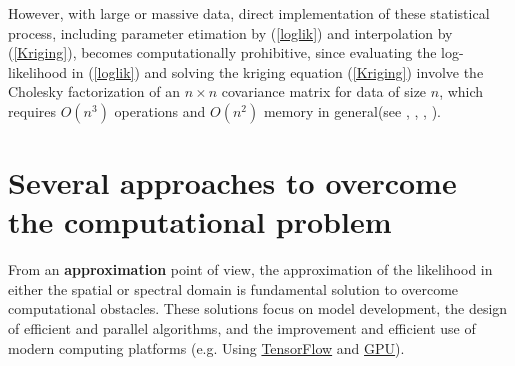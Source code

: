 \documentclass[
12pt, %
a4paper, %
oneside, %
headinclude,footinclude, %
BCOR5mm, %
]{scrartcl}
\begin{document}
However, with large or massive data, direct implementation of these statistical process, including parameter etimation by (\ref{loglik}) and interpolation by (\ref{Kriging}), becomes computationally prohibitive, since evaluating the log-likelihood in (\ref{loglik}) and solving the kriging equation (\ref{Kriging}) involve the Cholesky factorization of an $n \times n$ covariance matrix for data of size $n$, which requires $O(n^3)$ operations and $O(n^2)$ memory in general(see \href{https://chenyw68.github.io/Literature/[2012]Advances and Challenges in Space-time Modelling of Natural Events.pdf}{\cite{porcu2012advances}}, \href{https://chenyw68.github.io/Literature/[2012]A full scale approximation of covariance functions for large spatial data sets.pdf}{\cite{sang2012full}}, \href{https://chenyw68.github.io/Literature/[2018]A case study competition among methods for analyzing large spatial data.pdf}{\cite{heaton2019case}}, \href{https://chenyw68.github.io/Literature/[2020]A Fused Gaussian Process Model for Very Large Spatial Data.pdf}{\cite{ma2020fused}}).

\section{Several approaches to overcome the computational problem}
From an \textbf{approximation} point of view, the approximation of the likelihood in either the spatial or spectral domain is fundamental solution to overcome computational obstacles. These solutions focus on model development, the design of efficient and parallel algorithms, and the improvement and efficient use of modern computing platforms (e.g. Using \href{https://hpc.niasra.uow.edu.au/azm/Spatial_GPUs.html}{TensorFlow} and  \href{https://github.com/cdeterman/gpuR}{GPU}).
\end{document}
